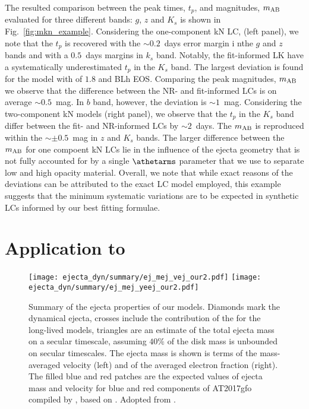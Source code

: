 The resulted comparison between the peak times, $t_p$, and magnitudes, $m_{\rm AB}$ 
evaluated for three different bands: $g$, $z$ and $K_s$ 
is shown in Fig.~\ref{fig:mkn_example}.
Considering the one-component \ac{kN} \ac{LC}, (left panel), we note that the $t_p$ is 
recovered with the ${\sim}0.2$~days error margin i nthe $g$ and $z$ bands and with a 
$0.5$~days margins in $k_s$ band. Notably, the fit-informed \ac{LK} have a systematically
underestimated $t_p$ in the $K_s$ band. 
The largest deviation is found for the model with \mr{} of $1.8$ and BLh \ac{EOS}.
Comparing the peak magnitudes, $m_{\rm AB}$ we observe that the difference 
between the \ac{NR}- and fit-informed \acp{LC} is on average ${\sim}0.5$~mag. 
In $b$ band, however, the deviation is ${\sim}1$~mag.
Considering the two-component \ac{kN} models (right panel), we observe that the 
$t_p$ in the $K_s$ band differ between the fit- and \ac{NR}-informed \acp{LC} by 
${\sim}2$~days. The $m_{\rm AB}$ is reproduced within the ${\sim}\pm 0.5$~mag in $z$ 
and $K_s$ bands.
The larger difference between the $m_{\rm AB}$ for one compoent \ac{kN} \acp{LC} lie 
in the influence of the ejecta geometry that is not fully accounted for by a single 
$\athetarms$ parameter that we use to separate low and high opacity material. 
Overall, we note that while exact reasons of the deviations can be attributed to 
the exact \ac{LC} model employed, this example suggests that the minimum systematic 
variations are to be expected in synthetic \acp{LC} informed by our best fitting formulae.



\section{Application to \GW{}}


\begin{figure*}[t]
    \centering 
    \texttt{[image: ejecta\_dyn/summary/ej\_mej\_vej\_our2.pdf]}
    \texttt{[image: ejecta\_dyn/summary/ej\_mej\_yeej\_our2.pdf]}
    \caption{
        Summary of the ejecta properties of our models.
        Diamonds mark the dynamical ejecta, crosses include the
        contribution of the \swind{} for the long-lived models, 
        triangles are an estimate of the total ejecta mass on a secular
        timescale, assuming $40\%$ of the disk mass is unbounded on
        secular timescales.         
        The ejecta mass is shown is terms of the mass-averaged velocity
        (left) and of the averaged electron fraction (right).
        The filled blue and red patches are the expected values of
        ejecta mass and velocity for blue and red components of
        AT2017gfo compiled by \cite{Siegel:2019mlp}, based on
        \cite{Villar:2017wcc}. 
        Adopted from \citet{Nedora:2020pak}.
    }
    \label{fig:ejecta:dyn:ds_sww}
\end{figure*}


